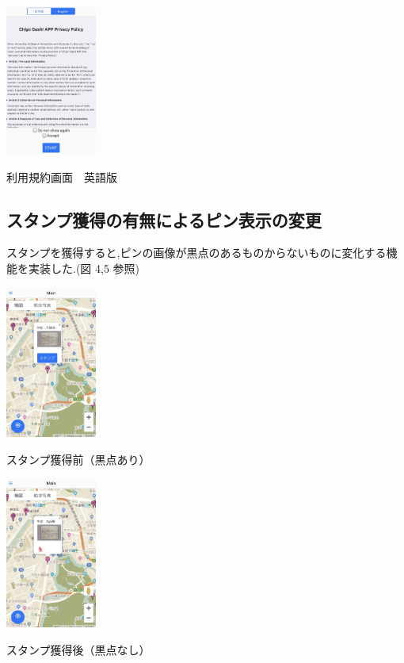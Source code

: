 \documentclass[a4paper, twoside]{jarticle}
\makeatletter
\newenvironment{figurehere}
  {\def\@captype{figure}}
  {}
\makeatother
\begin{document}
\begin{multicols}{2}
\begin{figurehere}
\begin{center}
\includegraphics[bb=30 50 550 1300,width=3cm]{./image03.jpg}%
\end{center}
\caption{利用規約画面　英語版}\label{fig:3}
\end{figurehere}


\subsection{スタンプ獲得の有無によるピン表示の変更}
スタンプを獲得すると,ピンの画像が黒点のあるものからないものに変化する機能を実装した.(図 4,5 参照)
\begin{figurehere}
\begin{center}
\includegraphics[bb=30 50 550 1300,width=3cm]{./image05.jpg}%
\end{center}
\caption{スタンプ獲得前（黒点あり）}\label{fig:4}

\begin{center}
\includegraphics[bb=30 50 550 1300,width=3cm]{./image06.jpg}%
\end{center}
\caption{スタンプ獲得後（黒点なし）}\label{fig:5}
\end{figurehere}


\end{multicols}
\end{document}
